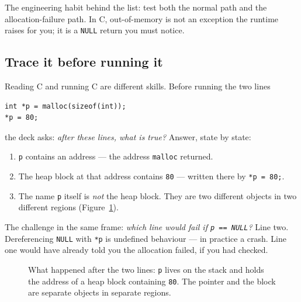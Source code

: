 \documentclass[11pt]{article}
\begin{document}
The engineering habit behind the list: test both the normal path and the
allocation-failure path. In C, out-of-memory is not an exception the runtime
raises for you; it is a \texttt{NULL} return you must notice.

\subsection{Trace it before running it}

Reading C and running C are different skills. Before running the two lines

{\footnotesize
\begin{verbatim}
int *p = malloc(sizeof(int));
*p = 80;
\end{verbatim}
}

the deck asks: \emph{after these lines, what is true?} Answer, state by state:

\begin{enumerate}
  \item \texttt{p} contains an address --- the address \texttt{malloc} returned.
  \item The heap block at that address contains \texttt{80} --- written there by
    \texttt{*p = 80;}.
  \item The name \texttt{p} itself is \emph{not} the heap block. They are two
    different objects in two different regions (Figure~\ref{fig:happened}).
\end{enumerate}

The challenge in the same frame: \emph{which line would fail if
\texttt{p == NULL}?} Line two. Dereferencing \texttt{NULL} with \texttt{*p} is
undefined behaviour --- in practice a crash. Line one would have already told you
the allocation failed, if you had checked.

\begin{figure}[h]
  \centering
  \caption{What happened after the two lines: \texttt{p} lives on the stack and
  holds the address of a heap block containing \texttt{80}. The pointer and the
  block are separate objects in separate regions.}
  \label{fig:happened}
\end{figure}
\end{document}
